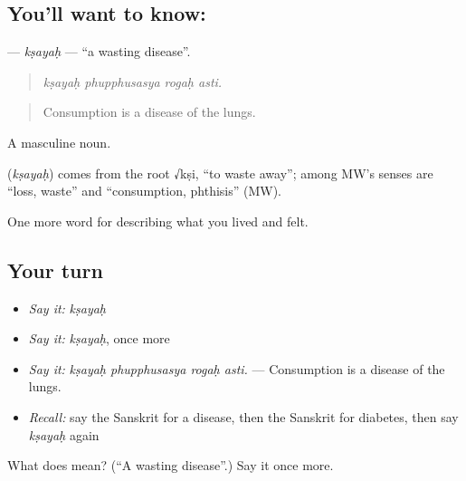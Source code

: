 \subsection*{You'll want to know: }
\textbf{} — \emph{kṣayaḥ} — \textquotedblleft{}a wasting disease\textquotedblright{}.

\begin{quote}
   
\end{quote}

\begin{quote}
\emph{kṣayaḥ phupphusasya rogaḥ asti.}
\end{quote}

\begin{quote}
Consumption is a disease of the lungs.
\end{quote}

A masculine noun.

\begin{cousinweb}
\textbf{} (\emph{kṣayaḥ}) comes from the root √kṣi, \textquotedblleft{}to waste away\textquotedblright{}; among MW's senses are \textquotedblleft{}loss, waste\textquotedblright{} and \textquotedblleft{}consumption, phthisis\textquotedblright{} (MW).
\end{cousinweb}

\begin{grammarlens}[title={What you've built}]
One more word for describing what you lived and felt.
\end{grammarlens}

\subsection*{Your turn}
\begin{itemize}
\raggedright
  \item \emph{Say it:} \emph{kṣayaḥ}
  \item \emph{Say it:} \emph{kṣayaḥ}, once more
  \item \emph{Say it:} \emph{kṣayaḥ phupphusasya rogaḥ asti.} — Consumption is a disease of the lungs.
  \item \emph{Recall:} say the Sanskrit for a disease, then the Sanskrit for diabetes, then say \emph{kṣayaḥ} again
\end{itemize}

\begin{tcolorbox}[breakable,colback=teal!4,colframe=teal!35!black,title={Before you move on}]
What does  mean? (\textquotedblleft{}A wasting disease\textquotedblright{}.) Say it once more.
\end{tcolorbox}
